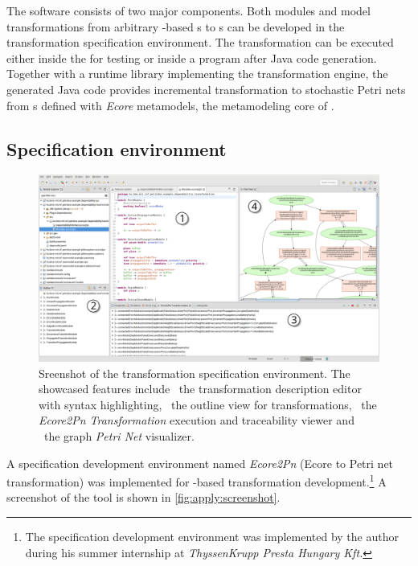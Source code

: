 The software consists of two major components. Both  modules and model transformations from arbitrary -based s to s can be developed in the transformation specification environment. The transformation can be executed either inside the  for testing or inside a  program after Java code generation. Together with a runtime library implementing the transformation engine, the generated Java code provides incremental transformation to stochastic Petri nets from s defined with \emph{Ecore} metamodels, the metamodeling core of .

\subsection{Specification environment}

\begin{figure}
  \centering
  \includegraphics[width={\dimexpr\textwidth-2\fboxrule},frame]{figures/annotated_screenshot}
  \caption{Sreenshot of the transformation specification environment. The showcased features include ~the transformation description editor with syntax highlighting, ~the outline view for transformations, ~the \emph{Ecore2Pn Transformation} execution and traceability viewer and ~the  graph \emph{Petri Net} visualizer.}
  \label{fig:apply:screenshot}
\end{figure}

A specification development environment named \emph{Ecore2Pn} (Ecore to Petri net transformation) was implemented for -based transformation development.\footnote{The specification development environment was implemented by the author during his summer internship at \emph{ThyssenKrupp Presta Hungary Kft.}} A screenshot of the tool is shown in \vref{fig:apply:screenshot}.

